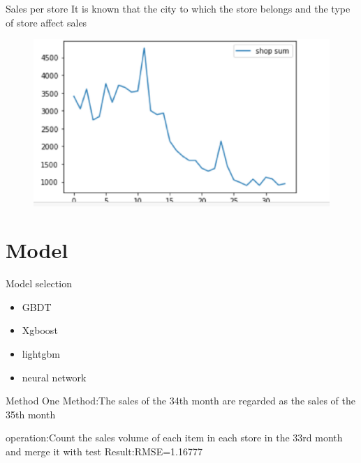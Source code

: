 \documentclass[
 size=14pt,
 paper=smartboard,  %
 mode=present, 		%
 display=slides, 	%
 style=tuliplab,  	%
 pauseslide,
 fleqn,leqno]{powerdot}
\begin{document}
\begin{slide}[toc=,bm=]{Sales per store}
  It is known that the city to which the store belongs and the type of store affect sales
  \begin{figure}
    \includegraphics[scale=0.5]{picture/data_19.eps}
  \end{figure}
\end{slide}


\section{Model}


\begin{slide}[toc=,bm=]{Model selection}
  \begin{itemize}
    \item GBDT
    \item Xgboost
    \item lightgbm
    \item neural network
  \end{itemize}
\end{slide}


\begin{slide}[toc=,bm=]{Method One}
  Method:The sales of the 34th month are regarded as the sales of the 35th month\par
  operation:Count the sales volume of each item in each store in the 33rd month and merge it with test
  Result:RMSE=1.16777
\end{slide}
\end{document}
